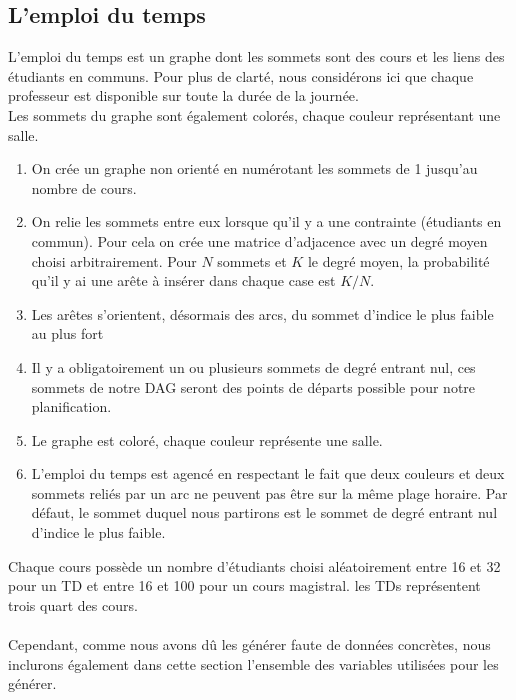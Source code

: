 \documentclass[a4paper,11pt]{article}
\begin{document}
	\subsection{L'emploi du temps}
		L'emploi du temps est un graphe dont les sommets sont des cours et les liens des étudiants en communs.
		Pour plus de clarté, nous considérons ici que chaque professeur est disponible sur toute la durée de la journée.\\
		Les sommets du graphe sont également colorés, chaque couleur représentant une salle.
		\begin{enumerate}
			\item On crée un graphe non orienté en numérotant les sommets de 1 jusqu'au nombre de cours.
			\item On relie les sommets entre eux lorsque qu'il y a une contrainte (étudiants en commun). Pour cela on crée une matrice d'adjacence avec un degré moyen choisi arbitrairement. Pour $N$ sommets et $K$ le degré moyen, la probabilité qu'il y ai une arête à insérer dans chaque case est $K/N$.
			\item Les arêtes s'orientent, désormais des arcs, du sommet d'indice le plus faible au plus fort
			\item Il y a obligatoirement un ou plusieurs sommets de degré entrant nul, ces sommets de notre DAG seront des points de départs possible pour notre planification.
			\item Le graphe est coloré, chaque couleur représente une salle.		
			\item L'emploi du temps est agencé en respectant le fait que deux couleurs et deux sommets reliés par un arc ne peuvent pas être sur la même plage horaire. Par défaut, le sommet duquel nous partirons est le sommet de degré entrant nul d'indice le plus faible.
		\end{enumerate}
		Chaque cours possède un nombre d'étudiants choisi aléatoirement entre 16 et 32 pour un TD et entre 16 et 100 pour un cours magistral. les TDs représentent trois quart des cours.\\
		\\	
		Cependant, comme nous avons dû les générer faute de données concrètes, nous inclurons également dans cette section l'ensemble des variables utilisées pour les générer.
\end{document}
